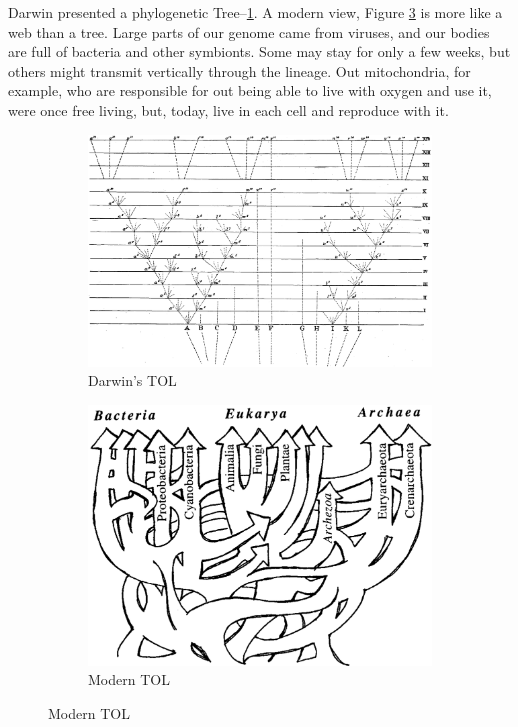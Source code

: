 \documentclass[]{article}
\begin{document}
Darwin presented a phylogenetic Tree--\ref{fig:TOL:Darwin}. A modern view, Figure \ref{fig:TOL:Modern} is more like a web than a tree. Large parts of our genome came from viruses, and our bodies are full of bacteria and other symbionts. Some may stay for only a few weeks, but others might transmit vertically through the lineage. Out mitochondria, for example, who are responsible for out being able to live with oxygen and use it, were once free living, but, today, live in each cell and reproduce with it.

\begin{figure}[H]
	\caption{Two views of the Tree of Life}
	\begin{subfigure}[b]{0.45\textwidth}
		\caption{Darwin's TOL\cite{darwin1859origin}}\label{fig:TOL:Darwin}
		\includegraphics[width=\textwidth]{TOL_Darwin}
	\end{subfigure}
	\begin{subfigure}[b]{0.45\textwidth}
		\caption{Modern TOL}\label{fig:TOL:Modern}
		\includegraphics[width=\textwidth]{TOL-5-6}
	\end{subfigure}
\end{figure}
\end{document}

